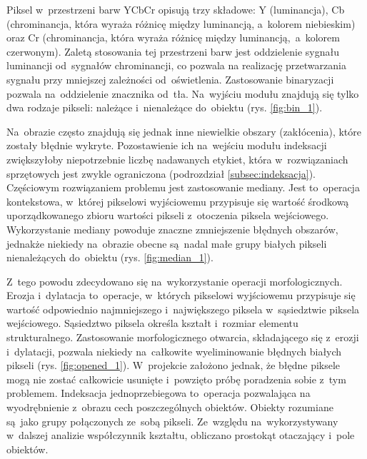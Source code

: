 Piksel w~przestrzeni barw YCbCr opisują trzy składowe: Y (luminancja), Cb (chrominancja, która wyraża różnicę między luminancją, a~kolorem niebieskim) oraz Cr (chrominancja, która wyraża różnicę między luminancją,~a~kolorem czerwonym). 
Zaletą stosowania tej przestrzeni barw jest oddzielenie sygnału luminancji od~sygnałów chrominancji, co pozwala na realizację przetwarzania sygnału przy mniejszej zależności od~oświetlenia.
Zastosowanie binaryzacji pozwala na~oddzielenie znacznika od~tła. 
Na~wyjściu modułu znajdują się tylko dwa rodzaje pikseli: należące i~nienależące do~obiektu (rys. \ref{fig:bin_1}).

Na~obrazie często znajdują się jednak inne niewielkie obszary (zakłócenia), które zostały błędnie wykryte. Pozostawienie ich na~wejściu modułu indeksacji zwiększyłoby niepotrzebnie liczbę nadawanych etykiet, która w~rozwiązaniach sprzętowych jest zwykle ograniczona (podrozdział \ref{subsec:indeksacja}).
Częściowym rozwiązaniem problemu jest zastosowanie mediany. 
Jest to~operacja kontekstowa, w~której pikselowi wyjściowemu przypisuje się wartość środkową uporządkowanego zbioru wartości pikseli z~otoczenia piksela wejściowego. 
Wykorzystanie mediany powoduje znaczne zmniejszenie błędnych obszarów, jednakże niekiedy na~obrazie obecne są~nadal małe grupy białych pikseli nienależących do~obiektu (rys. \ref{fig:median_1}).

Z~tego powodu zdecydowano się na~wykorzystanie operacji morfologicznych. 
Erozja i~dylatacja to~operacje, w~których pikselowi wyjściowemu przypisuje się wartość odpowiednio najmniejszego i~największego piksela w~sąsiedztwie piksela wejściowego. 
Sąsiedztwo piksela określa kształt i~rozmiar elementu strukturalnego.  
Zastosowanie morfologicznego otwarcia, składającego się z~erozji i~dylatacji, pozwala niekiedy na~całkowite wyeliminowanie błędnych białych pikseli (rys. \ref{fig:opened_1}).
W~projekcie założono jednak, że błędne piksele mogą nie zostać całkowicie usunięte i~powzięto próbę poradzenia sobie z~tym problemem.
Indeksacja jednoprzebiegowa to~operacja pozwalająca na wyodrębnienie z~obrazu cech poszczególnych obiektów. Obiekty rozumiane są~jako grupy połączonych ze~sobą pikseli. 
Ze~względu na~wykorzystywany w~dalszej analizie współczynnik kształtu, obliczano prostokąt otaczający i~pole obiektów. 


